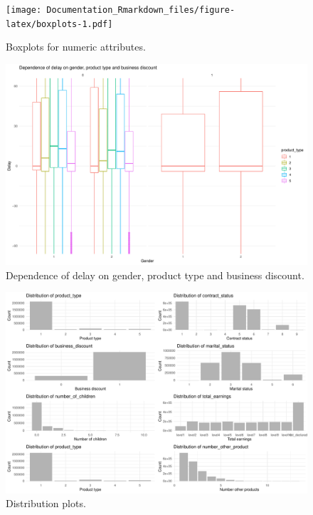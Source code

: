 \documentclass[
]{article}
\begin{document}
\begin{figure}
\centering
\texttt{[image: Documentation\_Rmarkdown\_files/figure-latex/boxplots-1.pdf]}
\caption{\label{fig:boxplots}\label{fig:boxplots}Boxplots for numeric attributes.}
\end{figure}

\begin{figure}
\centering
\includegraphics{Documentation_Rmarkdown_files/figure-latex/delay-gender-prod-1.pdf}
\caption{\label{fig:delay-gender-prod}\label{fig:delay-gender-prod}Dependence of delay on gender, product type and business discount.}
\end{figure}

\begin{figure}
\centering
\includegraphics{Documentation_Rmarkdown_files/figure-latex/distribution-1.pdf}
\caption{\label{fig:distribution}Distribution plots.}
\end{figure}
\end{document}
